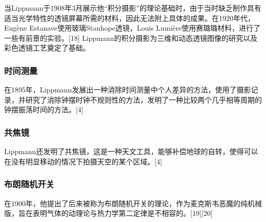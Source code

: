 当Lippmann于1908年3月展示他“积分摄影”的理论基础时，由于当时缺乏制作具有适当光学特性的透镜屏幕所需的材料，因此无法附上具体的成果。在1920年代，Eugène Estanave使用玻璃Stanhope透镜，Louis Lumière使用赛璐璐材料，进行了一些有前景的实验。[18] Lippmann的积分摄影为三维和动态透镜图像的研究以及彩色透镜工艺奠定了基础。
\subsubsection{时间测量}  
在1895年，Lippmann发展出一种消除时间测量中个人差异的方法，使用了摄影记录，并研究了消除钟摆时钟不规则性的方法，发明了一种比较两个几乎相等周期的钟摆振荡时间的方法。[4]
\subsubsection{共焦镜}  
Lippmann还发明了共焦镜，这是一种天文工具，能够补偿地球的自转，使得可以在没有明显移动的情况下拍摄天空的某个区域。[4]
\subsubsection{布朗随机开关}  
在1900年，他提出了后来被称为布朗随机开关的理论，作为麦克斯韦恶魔的纯机械版，旨在表明气体的动理论与热力学第二定律是不相容的。[19][20]